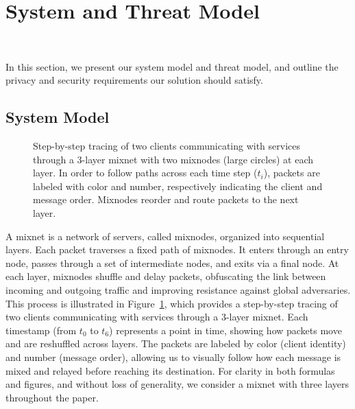 \section{System and Threat Model}~\label{sec:sys_model}

In this section, we present our system model and threat model, and outline the privacy and security requirements our solution should satisfy.

\subsection{System Model}

\begin{figure}
    \hspace*{-16mm}\resizebox{1.14\linewidth}{!}{}
    \caption{
        Step-by-step tracing of two clients communicating with services
through a 3-layer mixnet with two mixnodes (large circles) at each layer.
        In order to follow paths across each time step ($t_i$), packets are
labeled with color and number, respectively indicating the client and
message order.
        Mixnodes reorder and route packets to the next layer.
    }
    \label{fig:mixnet}
\end{figure}

A mixnet is a network of servers, called mixnodes, organized into sequential layers. 
Each packet traverses a fixed path of mixnodes. 
It enters through an entry node, passes through a set of intermediate nodes, and exits via a final node. 
At each layer, mixnodes shuffle and delay packets, obfuscating the link between incoming and outgoing traffic and improving resistance against global adversaries.
This process is illustrated in Figure~\ref{fig:mixnet}, which provides a step-by-step tracing of two clients communicating with services through a 3-layer mixnet. 
Each timestamp (from $t_0$ to $t_6$) represents a point in time, showing how packets move and are reshuffled across layers. 
The packets are labeled by color (client identity) and number (message order), allowing us to visually follow how each message is mixed and relayed before reaching its destination.
For clarity in both formulas and figures, and without loss of generality, we consider a mixnet with three layers throughout the paper.

